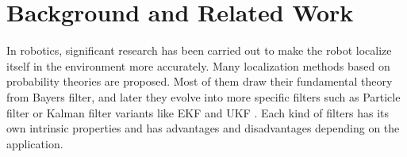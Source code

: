 \chapter{Background and Related Work\label{cha:chapter2}}

In robotics, significant research has been carried out to make the robot localize itself in the environment more accurately. Many localization methods based on probability theories are proposed. Most of them draw their fundamental theory from Bayers filter, and later they evolve into more specific filters such as Particle filter \cite{dellaert1999monte} or Kalman filter \cite{kalman1960new} variants like \gls{EKF} \cite{julier1997new} and \gls{UKF} \cite{van2001square}. Each kind of filters has its own intrinsic properties and has advantages and disadvantages depending on the application.

